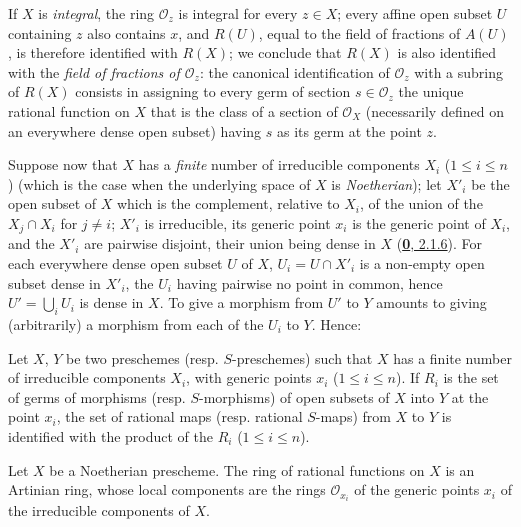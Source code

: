 If $X$ is \emph{integral}, the ring $\mathscr{O}_z$ is integral for every
$z\in X$; every affine open subset $U$ containing $z$ also contains $x$, and
$R(U)$, equal to the field of fractions of $A(U)$, is therefore identified
with $R(X)$; we conclude that $R(X)$ is also identified with the
\emph{field of fractions of $\mathscr{O}_z$}: the canonical identification of
$\mathscr{O}_z$ with a subring of $R(X)$ consists in assigning to every germ of
section $s\in\mathscr{O}_z$ the unique rational function on $X$ that is the
class of a section of $\mathscr{O}_X$ (necessarily defined on an everywhere
dense open subset) having $s$ as its germ at the point $z$.

\begin{env}[7.1.6]
\label{I.7.1.6}
Suppose now that $X$ has a \emph{finite} number of irreducible components
$X_i$ ($1\leq i\leq n$) (which is the case when the underlying space of $X$
is \emph{Noetherian}); let $X'_i$ be the open subset of $X$ which is the
complement, relative to $X_i$, of the union of the $X_j\cap X_i$ for
$j\neq i$; $X'_i$ is irreducible, its generic point $x_i$ is the generic point
of $X_i$, and the $X'_i$ are pairwise disjoint, their union being dense in $X$
(\hyperref[0.2.1.6]{\textbf{0}, 2.1.6}). For
each everywhere dense open subset $U$ of $X$, $U_i=U\cap X'_i$ is a non-empty
open subset dense in $X'_i$, the $U_i$ having pairwise no point in common,
hence $U'=\bigcup_i U_i$ is dense in $X$. To give a morphism from $U'$ to $Y$
amounts to giving (arbitrarily) a morphism from each of the $U_i$ to $Y$.
Hence:
\end{env}

\begin{proposition}[7.1.7]
\label{I.7.1.7}
Let $X$, $Y$ be two preschemes (\textup{resp.} $S$-preschemes) such that $X$ has a
finite number of irreducible components $X_i$, with generic points $x_i$
($1\leq i\leq n$). If $R_i$ is the set of germs of morphisms (\textup{resp.}
$S$-morphisms) of open subsets of $X$ into $Y$ at the point $x_i$, the set of
rational maps (\textup{resp.} rational $S$-maps) from $X$ to $Y$ is identified with the
product of the $R_i$ ($1\leq i\leq n$).
\end{proposition}

\begin{corollary}[7.1.8]
\label{I.7.1.8}
Let $X$ be a Noetherian prescheme. The ring of rational functions on $X$ is
an Artinian ring, whose local components are the rings
$\mathscr{O}_{x_i}$ of the generic points $x_i$ of the irreducible components
of $X$.
\end{corollary}

